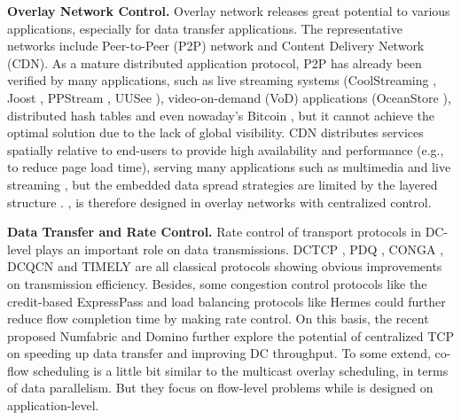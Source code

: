 \textbf{Overlay Network Control.}
Overlay network releases great potential to various applications, especially for data transfer applications. The representative networks include Peer-to-Peer (P2P) network and Content Delivery Network (CDN). As a mature distributed application protocol, P2P has already been verified by many applications, such as live streaming systems (CoolStreaming \cite{zhang2005coolstreaming}, Joost \cite{Joost}, PPStream \cite{PPStream}, UUSee \cite{UUSee}), video-on-demand (VoD) applications (OceanStore \cite{oceanstore}), distributed hash tables \cite{rhea2005opendht} and even nowaday's Bitcoin \cite{eyal2016bitcoin}, but it cannot achieve the optimal solution due to the lack of global visibility. CDN distributes services spatially relative to end-users to provide high availability and performance (e.g., to reduce page load time), serving many applications such as multimedia \cite{zhu2011multimedia} and live streaming \cite{sripanidkulchai2004analysis}, but the embedded data spread strategies are limited by the layered structure \cite{kostic2003bullet}. \name, is therefore designed in overlay networks with centralized control.

\textbf{Data Transfer and Rate Control.}
Rate control of transport protocols in DC-level plays an important role on data transmissions. DCTCP \cite{Alizadeh2010Data}, PDQ \cite{Hong2012Finishing}, CONGA \cite{Alizadeh2014CONGA}, DCQCN \cite{Zhu2015Congestion} and TIMELY \cite{Mittal2015TIMELY} are all classical protocols showing obvious improvements on transmission efficiency. Besides, some congestion control protocols like the credit-based ExpressPass \cite{Han2017Credit} and load balancing protocols like Hermes \cite{Zhang2017Resilient} could further reduce flow completion time by making rate control. On this basis, the recent proposed Numfabric \cite{nagaraj2016numfabric} and Domino \cite{sivaraman2016packet} further explore the potential of centralized TCP on speeding up data transfer and improving DC throughput. To some extend, co-flow scheduling \cite{Chowdhury2012Coflow,Zhang2016CODA} is a little bit similar to the multicast overlay scheduling, in terms of data parallelism. But they focus on flow-level problems while \name is designed on application-level.%

